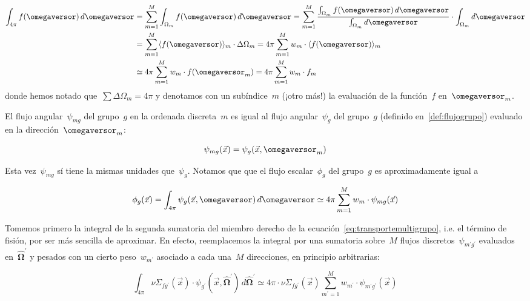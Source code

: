 \begin{align}
 \int_{4\pi} f(\omegaversor) \, d\omegaversor &=
\sum_{m=1}^M \int_{\Omega_m} f(\omegaversor) \, d\omegaversor
= \sum_{m=1}^M \frac{\int_{\Omega_m} f(\omegaversor) \, d\omegaversor}{\int_{\Omega_m} d\omegaversor} \cdot \int_{\Omega_m} d\omegaversor \nonumber \\
&= \sum_{m=1}^M \langle f(\omegaversor) \rangle_m \cdot \Delta \Omega_m
= 4\pi  \sum_{m=1}^M w_m \cdot \langle f(\omegaversor) \rangle_m \nonumber \\
&\simeq 4\pi  \sum_{m=1}^M w_m \cdot f(\omegaversor_m) = 4\pi \sum_{m=1}^M w_m \cdot f_m \label{eq:cuadratura}
\end{align}
%
donde hemos notado que~$\sum \Delta \Omega_m = 4\pi$ y denotamos con un subíndice~$m$ (¡otro más!) la evaluación de la función~$f$ en~$\omegaversor_m$.

\begin{definicion}
El flujo angular~$\psi_{mg}$ del grupo~$g$ en la ordenada discreta~$m$ es igual al flujo angular~$\psi_g$ del grupo~$g$ (definido en~\ref{def:flujogrupo}) evaluado en la dirección~$\omegaversor_m$:

\begin{equation*}
 \psi_{mg}(\vec{x}) = \psi_{g}(\vec{x}, \omegaversor_m)
\end{equation*}

Esta vez~$\psi_{mg}$ sí tiene la mismas unidades que~$\psi_{g}$. Notamos que que el flujo escalar~$\phi_g$ del grupo~$g$ es aproximadamente igual a

\begin{equation}\label{eq:phig_4pi_psimg}
\phi_g(\vec{x}) = \int_{4\pi} \psi_g(\vec{x}, \omegaversor) \, d\omegaversor 
\simeq 4\pi \sum_{m=1}^M w_m \cdot \psi_{mg}(\vec{x})
\end{equation}
\end{definicion}


Tomemos primero la integral de la segunda sumatoria del miembro derecho de la ecuación~\eqref{eq:transportemultigrupo}, i.e. el término de fisión, por ser más sencilla de aproximar. En efecto, reemplacemos la integral por una sumatoria sobre~$M$ flujos discretos~$\psi_{m^\prime g^\prime}$ evaluados en~$\boldsymbol{\hat{\Omega}^\prime}$ y pesados con un cierto peso~$w_{m^\prime}$ asociado a cada una~$M$ direcciones, en principio arbitrarias:

\begin{equation*}
\int_{4\pi} \nu\Sigma_{fg^\prime}(\vec{x}) \cdot \psi_{g^\prime}(\vec{x}, \boldsymbol{\hat{\Omega}^\prime}) \, d\boldsymbol{\hat{\Omega}^\prime}
\simeq 4\pi \cdot \nu\Sigma_{fg^\prime}(\vec{x}) \sum_{m^\prime=1}^M w_{m^\prime} \cdot \psi_{m^\prime g^\prime}(\vec{x})
\end{equation*}

